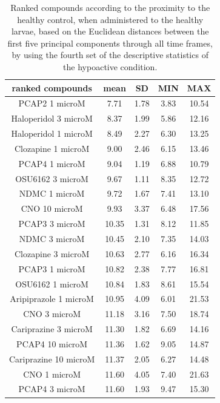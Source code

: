\documentclass[a4paper,12pt]{article}
\begin{document}
\begin{table}[h!]\tiny
\centering
\caption{Ranked compounds according to the proximity to the healthy control, when administered to the healthy larvae, based on the Euclidean distances between the first five principal components through all time frames, by using the fourth set of the descriptive statistics of the hypoactive condition.}
\begin{tabular}{|c|c|c|c|c|}
\hline
ranked compounds             & mean & SD   & MIN  & MAX   \\ \hline
PCAP2 1 microM         & 7.71  & 1.78 & 3.83  & 10.54 \\ \hline
Haloperidol 3 microM   & 8.37  & 1.99 & 5.86  & 12.16 \\ \hline
Haloperidol 1 microM   & 8.49  & 2.27 & 6.30   & 13.25 \\ \hline
Clozapine 1 microM     & 9.00     & 2.46 & 6.15  & 13.46 \\ \hline
PCAP4 1 microM       & 9.04  & 1.19 & 6.88  & 10.79 \\ \hline
OSU6162 3 microM       & 9.67  & 1.11 & 8.35  & 12.72 \\ \hline
NDMC 1 microM          & 9.72  & 1.67 & 7.41  & 13.10  \\ \hline
CNO 10 microM          & 9.93  & 3.37 & 6.48  & 17.56 \\ \hline
PCAP3 3 microM       & 10.35 & 1.31 & 8.12  & 11.85 \\ \hline
NDMC 3 microM          & 10.45 & 2.10  & 7.35  & 14.03 \\ \hline
Clozapine 3 microM     & 10.63 & 2.77 & 6.16  & 16.34 \\ \hline
PCAP3 1 microM       & 10.82 & 2.38 & 7.77  & 16.81 \\ \hline
OSU6162 1 microM       & 10.84 & 1.83 & 8.61  & 15.54 \\ \hline
Aripiprazole 1 microM  & 10.95 & 4.09 & 6.01  & 21.53 \\ \hline
CNO 3 microM           & 11.18 & 3.16 & 7.50   & 18.74 \\ \hline
Cariprazine 3 microM   & 11.30  & 1.82 & 6.69  & 14.16 \\ \hline
PCAP4 10 microM      & 11.36 & 1.62 & 9.05  & 14.87 \\ \hline
Cariprazine 10 microM  & 11.37 & 2.05 & 6.27  & 14.48 \\ \hline
CNO 1 microM           & 11.60  & 4.05 & 7.40   & 21.63 \\ \hline
PCAP4 3 microM       & 11.60  & 1.93 & 9.47  & 15.30  \\ \hline

\end{tabular}
\end{table}
\end{document}
